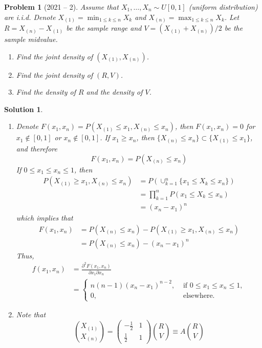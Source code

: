 \documentclass[12pt]{amsart}
\newtheorem{problem}{Problem}
\newtheorem*{solution}{Solution}
\begin{document}
\begin{problem}[2021 -- 2]
Assume that $X_1, \ldots, X_n \sim U[0,1]$ (uniform distribution) are i.i.d. Denote $X_{(1)}=\min _{1 \leq k \leq n} X_k$ and $X_{(n)}=\max _{1 \leq k \leq n} X_k$. Let $R=X_{(n)}-X_{(1)}$ be the sample range and $V=(X_{(1)}+X_{(n)}) / 2$ be the sample midvalue.
\begin{enumerate}[label=(\alph*)]
\item Find the joint density of $(X_{(1)}, X_{(n)})$.
\item Find the joint density of $(R, V)$.
\item Find the density of $R$ and the density of $V$.
\end{enumerate}
\end{problem}
\begin{solution}
\begin{enumerate}[label=(\alph*)]
\item Denote $F(x_1, x_n)=P(X_{(1)} \leq x_1, X_{(n)} \leq x_n)$, then $F(x_1, x_n)=0$ for $x_1 \notin[0,1]$ or $x_n \notin[0,1]$. If $x_1 \geq x_n$, then $\{X_{(n)} \leq x_n\} \subset\{X_{(1)} \leq x_1\}$, and therefore
$$
F(x_1, x_n)=P(X_{(n)} \leq x_n)
$$
If $0 \leq x_1 \leq x_n \leq 1$, then
\begin{align*}
P(X_{(1)} \geq x_1, X_{(n)} \leq x_n) & =P(\cup_{k=1}^n\{x_1 \leq X_k \leq x_n\}) \\
& =\prod_{k=1}^n P(x_1 \leq X_k \leq x_n) \\
& =(x_n-x_1)^n
\end{align*}
which implies that
\begin{align*}
F(x_1, x_n) & =P(X_{(n)} \leq x_n)-P(X_{(1)} \geq x_1, X_{(n)} \leq x_n) \\
& =P(X_{(n)} \leq x_n)-(x_n-x_1)^n
\end{align*}
Thus,
\begin{align*}
f(x_1, x_n) & =\frac{\partial^2 F(x_1, x_n)}{\partial x_1 \partial x_n} \\
& = \begin{cases}n(n-1)(x_n-x_1)^{n-2}, & \text { if } 0 \leq x_1 \leq x_n \leq 1, \\
0, & \text { elsewhere. }\end{cases}
\end{align*}
\item Note that
$$
\binom{X_{(1)}}{X_{(n)}}=\begin{pmatrix} -\frac{1}{2} & 1 \\ \frac{1}{2} & 1 \end{pmatrix} \binom{R}{V} \equiv A\binom{R}{V}
$$
\end{enumerate}
\end{solution}
\end{document}
